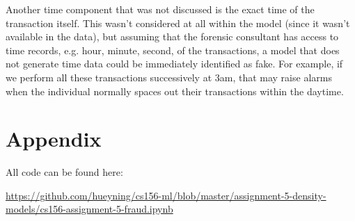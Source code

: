 \documentclass[11pt]{article}
\begin{document}
Another time component that was not discussed is the exact time of the
transaction itself. This wasn't considered at all within the model
(since it wasn't available in the data), but assuming that the forensic
consultant has access to time records, e.g. hour, minute, second, of the
transactions, a model that does not generate time data could be
immediately identified as fake. For example, if we perform all these
transactions successively at 3am, that may raise alarms when the
individual normally spaces out their transactions within the daytime.
\newpage
\section{Appendix}

All code can be found here:

\url{https://github.com/hueyning/cs156-ml/blob/master/assignment-5-density-models/cs156-assignment-5-fraud.ipynb}


    
    
    
    
\end{document}
